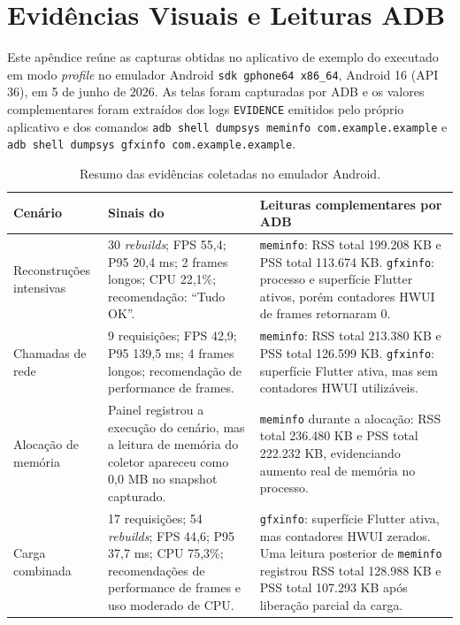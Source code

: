 \chapter{Evidências Visuais e Leituras ADB}
\label{ap:evidencias}

Este apêndice reúne as capturas obtidas no aplicativo de exemplo do \collectorFlutter{} executado em modo \textit{profile} no emulador Android \texttt{sdk gphone64 x86\_64}, Android 16 (API 36), em 5 de junho de 2026.
As telas foram capturadas por ADB e os valores complementares foram extraídos dos logs \texttt{EVIDENCE} emitidos pelo próprio aplicativo e dos comandos \texttt{adb shell dumpsys meminfo com.example.example} e \texttt{adb shell dumpsys gfxinfo com.example.example}.

\begin{table}[htbp]
\centering
\caption{Resumo das evidências coletadas no emulador Android.}
\label{tab:ap-evidencias-adb}
\small
\renewcommand{\arraystretch}{1.25}
\begin{tabular}{|p{2.7cm}|p{5.3cm}|p{5.3cm}|}
\hline
\textbf{Cenário} & \textbf{Sinais do \collectorFlutter{}} & \textbf{Leituras complementares por ADB} \\
\hline
Reconstruções intensivas & 30 \textit{rebuilds}; FPS 55{,}4; P95 20{,}4 ms; 2 frames longos; CPU 22{,}1\%; recomendação: ``Tudo OK''. & \texttt{meminfo}: RSS total 199.208 KB e PSS total 113.674 KB. \texttt{gfxinfo}: processo e superfície Flutter ativos, porém contadores HWUI de frames retornaram 0. \\
\hline
Chamadas de rede & 9 requisições; FPS 42{,}9; P95 139{,}5 ms; 4 frames longos; recomendação de performance de frames. & \texttt{meminfo}: RSS total 213.380 KB e PSS total 126.599 KB. \texttt{gfxinfo}: superfície Flutter ativa, mas sem contadores HWUI utilizáveis. \\
\hline
Alocação de memória & Painel registrou a execução do cenário, mas a leitura de memória do coletor apareceu como 0{,}0 MB no snapshot capturado. & \texttt{meminfo} durante a alocação: RSS total 236.480 KB e PSS total 222.232 KB, evidenciando aumento real de memória no processo. \\
\hline
Carga combinada & 17 requisições; 54 \textit{rebuilds}; FPS 44{,}6; P95 37{,}7 ms; CPU 75{,}3\%; recomendações de performance de frames e uso moderado de CPU. & \texttt{gfxinfo}: superfície Flutter ativa, mas contadores HWUI zerados. Uma leitura posterior de \texttt{meminfo} registrou RSS total 128.988 KB e PSS total 107.293 KB após liberação parcial da carga. \\
\hline
\end{tabular}
\end{table}

